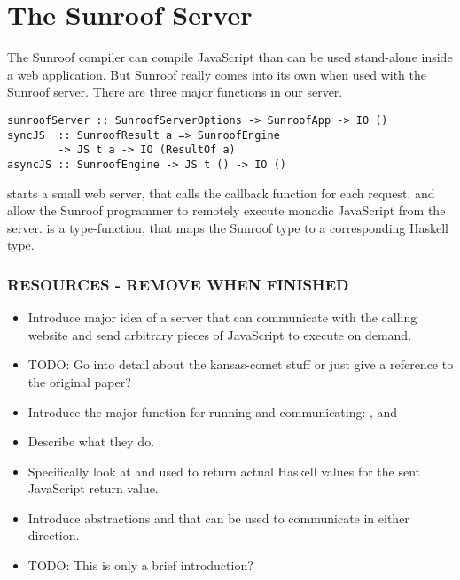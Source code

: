  
\section{The Sunroof Server}
\label{sec:server}

The Sunroof compiler can compile JavaScript than can be used
stand-alone inside a web application. But Sunroof really comes
into its own when used with the Sunroof server. There
are three major functions in our server.

\begin{verbatim}
sunroofServer :: SunroofServerOptions -> SunroofApp -> IO ()
syncJS  :: SunroofResult a => SunroofEngine 
        -> JS t a -> IO (ResultOf a)
asyncJS :: SunroofEngine -> JS t () -> IO ()
\end{verbatim}        

 starts a small web server,
that calls the callback function for each request.
 and  allow the Sunroof programmer
to remotely execute monadic JavaScript from the server.
 is a type-function, that maps the 
Sunroof type to a corresponding Haskell type.


\subsubsection{RESOURCES - REMOVE WHEN FINISHED}

\begin{itemize}
\item Introduce major idea of a server that can communicate
with the calling website and send arbitrary pieces
of JavaScript to execute on demand.
\item TODO: Go into detail about the kansas-comet stuff 
or just give a reference to the original paper?
\item Introduce the major function for running and communicating:
,  and 
\item Describe what they do.
\item Specifically look at  and 
used to return actual Haskell values for the sent JavaScript return value.
\item Introduce abstractions  and  that
can be used to communicate in either direction.
\item TODO: This is only a brief introduction?
\end{itemize}






